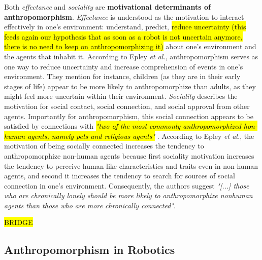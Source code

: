 \documentclass[lettersize, apacite, twoside, HRI]{apa_HRI}
\begin{document}
	Both \textit{effectance} and \textit{sociality} are \textbf{motivational determinants of anthropomorphism}. \textit{Effectance} is understood as the motivation to interact effectively in one's environment: understand, predict, \hl{reduce uncertainty (this feeds again our hypothesis that as soon as a robot is not uncertain anymore, there is no need to keep on anthropomorphizing it)} about one's environment and the agents that inhabit it. According to Epley \textit{et al.}, anthropomorphism serves as one way to reduce uncertainty and increase comprehension of events in one's environment. They mention for instance, children (as they are in their early stages of life) appear to be more likely to anthropomorphize than adults, as they might feel more uncertain within their environment.
	\textit{Sociality} describes the motivation for social contact, social connection, and social approval from other agents. Importantly for anthropomorphism, this social connection appears to be satisfied by connections with \hl{ \textit{"two of the most commonly anthropomorphized hon-human agents, namely pets and religious agents"}} \cite{epley_seeing_2007}. According to Epley \textit{et al.}, the motivation of being socially connected increases the tendency to anthropomorphize non-human agents because first sociality motivation increases the tendency to perceive human-like characteristics and traits even in non-human agents, and second it increases the tendency to search for sources of social connection in one's environment. Consequently, the authors suggest \textit{"[...] those who are chronically lonely should be more likely to anthropomorphize nonhuman agents than those who are more chronically connected"}. 
	
	\hl{BRIDGE}
	


\subsection{Anthropomorphism in Robotics}
\label{sec:3.3}
	
\end{document}
